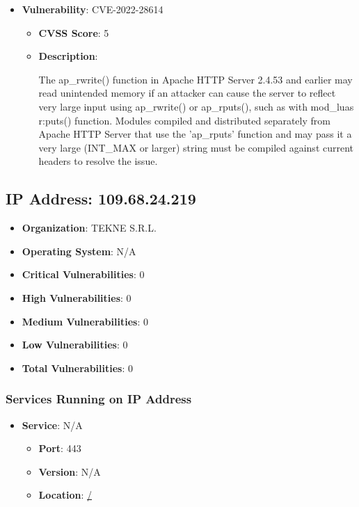 \documentclass{article}
\begin{document}
\begin{itemize}
        \item \textbf{Vulnerability}: CVE-2022-28614
        \begin{itemize}
            \item \textbf{CVSS Score}:  5 
            \item \textbf{Description}:
            \parbox[t]{0.9\linewidth}{
                \ttfamily The ap\_rwrite() function in Apache HTTP Server 2.4.53 and earlier may read unintended memory if an attacker can cause the server to reflect very large input using ap\_rwrite() or ap\_rputs(), such as with mod\_luas r:puts() function. Modules compiled and distributed separately from Apache HTTP Server that use the 'ap\_rputs' function and may pass it a very large (INT\_MAX or larger) string must be compiled against current headers to resolve the issue.
            }
        \end{itemize}
    
\end{itemize}




\clearpage



\subsection{IP Address: 109.68.24.219}

\begin{itemize}
    \item \textbf{Organization}: TEKNE S.R.L.
    \item \textbf{Operating System}:  N/A 
    \item \textbf{Critical Vulnerabilities}: 0
    \item \textbf{High Vulnerabilities}: 0
    \item \textbf{Medium Vulnerabilities}: 0
    \item \textbf{Low Vulnerabilities}: 0
    \item \textbf{Total Vulnerabilities}: 0
\end{itemize}

\subsubsection*{Services Running on IP Address}

\begin{itemize}
    
        \item \textbf{Service}: N/A
        \begin{itemize}
            \item \textbf{Port}: 443
            \item \textbf{Version}:  N/A 
            \item \textbf{Location}: \href{ / }{ / }
        \end{itemize}
    
\end{itemize}
\end{document}
